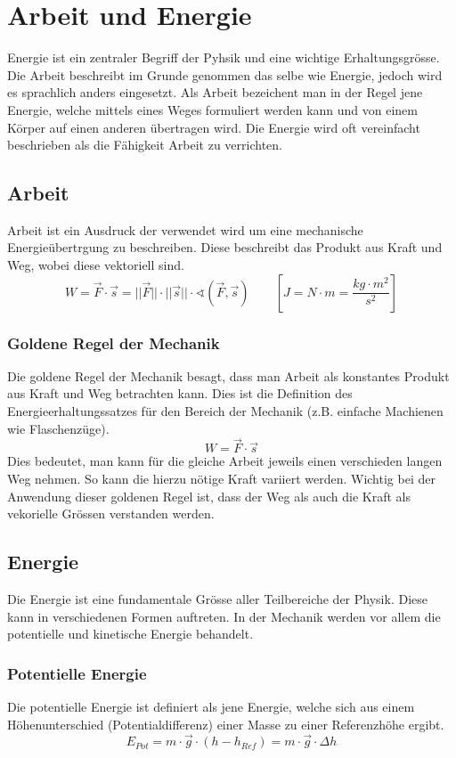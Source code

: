 \chapter{Arbeit und Energie}

Energie ist ein zentraler Begriff der Pyhsik und eine wichtige 
Erhaltungsgrösse. Die Arbeit beschreibt im Grunde genommen das selbe wie 
Energie, jedoch wird es sprachlich anders eingesetzt. Als Arbeit 
bezeichent man in der Regel jene Energie, welche mittels eines Weges 
formuliert werden kann und von einem Körper auf einen anderen übertragen 
wird. Die Energie wird oft vereinfacht beschrieben als die Fähigkeit
Arbeit zu verrichten.

\newpage
\section{Arbeit}
Arbeit ist ein Ausdruck der verwendet wird um eine mechanische 
Energieübertrgung zu beschreiben. Diese beschreibt das Produkt aus
Kraft und Weg, wobei diese vektoriell sind.
\[ \boxed{ W = \vec{F} \cdot \vec{s} 
	= ||\vec{F}|| \cdot ||\vec{s}|| \cdot 
	\sphericalangle \left( \vec{F}, \vec{s} \right) } 
	\qquad \left[ J = N \cdot m = \frac{kg \cdot m^2}{s^2} \right] \]

\subsection{Goldene Regel der Mechanik}
Die goldene Regel der Mechanik besagt, dass man Arbeit als konstantes 
Produkt aus Kraft und Weg betrachten kann. Dies ist die Definition des
Energieerhaltungssatzes für den Bereich der Mechanik (z.B. einfache
Machienen wie Flaschenzüge). 
\[ \boxed{W = \vec{F} \cdot \vec{s}} \] 
Dies bedeutet, man kann für die gleiche Arbeit jeweils einen verschieden
langen Weg nehmen. So kann die hierzu nötige Kraft variiert werden. 
Wichtig bei der Anwendung dieser goldenen Regel ist, dass der Weg als
auch die Kraft als vekorielle Grössen verstanden werden. 

\section{Energie}
Die Energie ist eine fundamentale Grösse aller Teilbereiche der Physik.
Diese kann in verschiedenen Formen auftreten. In der Mechanik werden vor
allem die potentielle und kinetische Energie behandelt.

\subsection{Potentielle Energie}
Die potentielle Energie ist definiert als jene Energie, welche sich aus
einem Höhenunterschied (Potentialdifferenz) einer Masse zu einer 
Referenzhöhe ergibt. 
\[ \boxed{ E_{Pot} 
	= m \cdot \vec{g} \cdot (h - h_{Ref})
	= m \cdot \vec{g} \cdot \Delta h 
} \]

